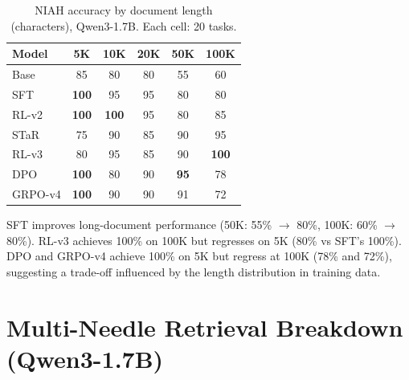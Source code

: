 \documentclass{article}
\begin{document}
\begin{table}[t]
\caption{NIAH accuracy by document length (characters), Qwen3-1.7B. Each cell: 20 tasks.}
\label{tab:niah-length}
\vskip 0.15in
\begin{center}
\begin{small}
\begin{sc}
\begin{tabular}{lccccc}
\toprule
Model & 5K & 10K & 20K & 50K & 100K \\
\midrule
Base  & 85 & 80 & 80 & 55 & 60 \\
SFT   & \textbf{100} & 95 & 95 & 80 & 80 \\
RL-v2 & \textbf{100} & \textbf{100} & 95 & 80 & 85 \\
STaR  & 75 & 90 & 85 & 90 & 95 \\
RL-v3 & 80 & 95 & 85 & 90 & \textbf{100} \\
\midrule
DPO   & \textbf{100} & 80 & 90 & \textbf{95} & 78 \\
GRPO-v4 & \textbf{100} & 90 & 90 & 91 & 72 \\
\bottomrule
\end{tabular}
\end{sc}
\end{small}
\end{center}
\vskip -0.15in
\end{table}

SFT improves long-document performance (50K: 55\% $\to$ 80\%, 100K: 60\% $\to$ 80\%). RL-v3 achieves 100\% on 100K but regresses on 5K (80\% vs SFT's 100\%). DPO and GRPO-v4 achieve 100\% on 5K but regress at 100K (78\% and 72\%), suggesting a trade-off influenced by the length distribution in training data.

\section{Multi-Needle Retrieval Breakdown (Qwen3-1.7B)}
\label{app:mniah-breakdown}
\end{document}

